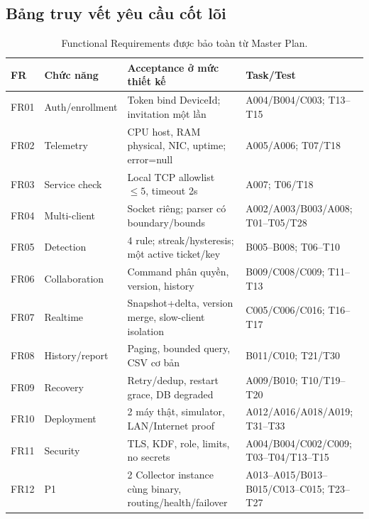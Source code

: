 \subsection{Bảng truy vết yêu cầu cốt lõi}

\begin{table}[!ht]
\centering
\caption{Functional Requirements được bảo toàn từ Master Plan.}
\label{tab:fr-trace}
\scriptsize
\begin{tabularx}{\textwidth}{p{1.1cm} p{3.1cm} X >{\raggedright\arraybackslash}p{2.6cm}}
\toprule
\textbf{FR} & \textbf{Chức năng} & \textbf{Acceptance ở mức thiết kế} & \textbf{Task/Test} \\
\midrule
FR01 & Auth/enrollment & Token bind DeviceId; invitation một lần & A004/B004/C003; T13--T15 \\
FR02 & Telemetry & CPU host, RAM physical, NIC, uptime; error=null & A005/A006; T07/T18 \\
FR03 & Service check & Local TCP allowlist $\leq 5$, timeout 2s & A007; T06/T18 \\
FR04 & Multi-client & Socket riêng; parser có boundary/bounds & A002/A003/\-B003/A008; T01--T05/T28 \\
FR05 & Detection & 4 rule; streak/hysteresis; một active ticket/key & B005--B008; T06--T10 \\
FR06 & Collaboration & Command phân quyền, version, history & B009/C008/C009; T11--T13 \\
FR07 & Realtime & Snapshot+delta, version merge, slow-client isolation & C005/C006/C016; T16--T17 \\
FR08 & History/report & Paging, bounded query, CSV cơ bản & B011/C010; T21/T30 \\
FR09 & Recovery & Retry/dedup, restart grace, DB degraded & A009/B010; T10/T19--T20 \\
FR10 & Deployment & 2 máy thật, simulator, LAN/Internet proof & A012/A016/\-A018/A019; T31--T33 \\
FR11 & Security & TLS, KDF, role, limits, no secrets & A004/B004/\-C002/C009; T03--T04/T13--T15 \\
FR12 & P1 & 2 Collector instance cùng binary, routing/health/failover & A013--A015/\-B013--B015/\-C013--C015; T23--T27 \\
\bottomrule
\end{tabularx}
\end{table}
